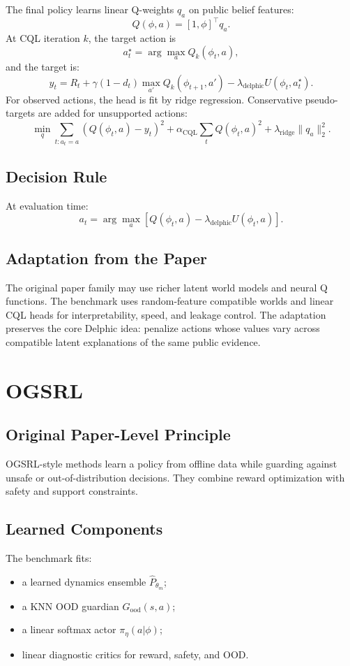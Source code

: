 \documentclass[11pt]{article}
\newcommand{\1}{\mathbf{1}}
\begin{document}
The final policy learns linear Q-weights $q_a$ on public belief features:
\[
  Q(\phi,a)=[1,\phi]^\top q_a.
\]
At CQL iteration $k$, the target action is
\[
  a^\star_t=\arg\max_a Q_k(\phi_t,a),
\]
and the target is:
\[
  y_t =
  R_t+\gamma(1-d_t)\max_{a'}Q_k(\phi_{t+1},a')
  -\lambda_{\mathrm{delphic}}U(\phi_t,a^\star_t).
\]
For observed actions, the head is fit by ridge regression.  Conservative
pseudo-targets are added for unsupported actions:
\[
  \min_q
  \sum_{t:a_t=a}(Q(\phi_t,a)-y_t)^2
  +\alpha_{\mathrm{CQL}}\sum_t Q(\phi_t,a)^2
  +\lambda_{\mathrm{ridge}}\|q_a\|_2^2.
\]

\subsection{Decision Rule}

At evaluation time:
\[
  a_t =
  \arg\max_a
  \left[
    Q(\phi_t,a)-\lambda_{\mathrm{delphic}}U(\phi_t,a)
  \right].
\]

\subsection{Adaptation from the Paper}

The original paper family may use richer latent world models and neural Q
functions.  The benchmark uses random-feature compatible worlds and linear CQL
heads for interpretability, speed, and leakage control.  The adaptation preserves
the core Delphic idea: penalize actions whose values vary across compatible
latent explanations of the same public evidence.

\section{OGSRL}

\subsection{Original Paper-Level Principle}

OGSRL-style methods learn a policy from offline data while guarding against
unsafe or out-of-distribution decisions.  They combine reward optimization with
safety and support constraints.

\subsection{Learned Components}

The benchmark fits:
\begin{itemize}[leftmargin=*]
  \item a learned dynamics ensemble $\hat{P}_{\theta_m}$;
  \item a KNN OOD guardian $G_{\mathrm{ood}}(s,a)$;
  \item a linear softmax actor $\pi_\eta(a|\phi)$;
  \item linear diagnostic critics for reward, safety, and OOD.
\end{itemize}
\end{document}
